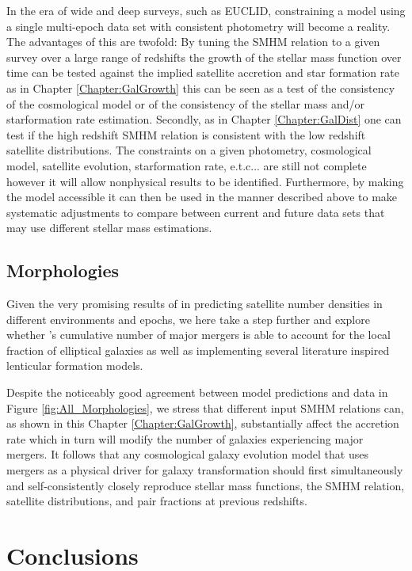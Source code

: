 In the era of wide and deep surveys, such as EUCLID, constraining a model using a single multi-epoch data set with consistent photometry will become a reality. The advantages of this are twofold: By tuning the SMHM relation to a given survey over a large range of redshifts the growth of the stellar mass function over time can be tested against the implied satellite accretion and star formation rate as in Chapter \ref{Chapter:GalGrowth} this can be seen as a test of the consistency of the cosmological model or of the consistency of the stellar mass and/or starformation rate estimation. Secondly, as in Chapter \ref{Chapter:GalDist} one can test if the high redshift SMHM relation is consistent with the low redshift satellite distributions. The constraints on a given photometry, cosmological model, satellite evolution, starformation rate, e.t.c... are still not complete however it will allow nonphysical results to be identified. Furthermore, by making the model accessible it can then be used in the manner described above to make systematic adjustments to compare between current and future data sets that may use different stellar mass estimations.

\subsection{Morphologies}

Given the very promising results of \steel in predicting satellite number densities in different environments and epochs, we here take a step further and explore whether \steel's cumulative number of major mergers is able to account for the local fraction of elliptical galaxies as well as implementing several literature inspired lenticular formation models. 

Despite the noticeably good agreement between model predictions and data in Figure \ref{fig:All_Morphologies}, we stress that different input SMHM relations can, as shown in this Chapter \ref{Chapter:GalGrowth}, substantially affect the accretion rate which in turn will modify the number of galaxies experiencing major mergers. It follows that any cosmological galaxy evolution model that uses mergers as a physical driver for galaxy transformation should first simultaneously and self-consistently closely reproduce stellar mass functions, the SMHM relation, satellite distributions, and pair fractions at previous redshifts.

\section{Conclusions}
\label{sec:Conclusions}

